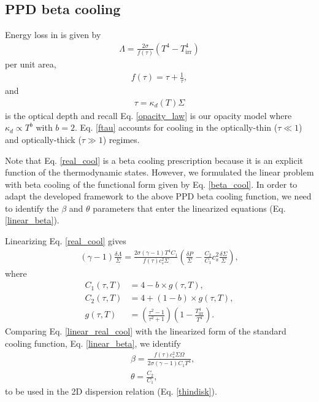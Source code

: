 \subsection{PPD beta cooling}\label{ppd_cooling}
Energy loss in  is given by 
\begin{align}\label{real_cool}
  \Lambda = \frac{2\sigma}{f(\tau)}\left(T^4 - T_\mathrm{irr}^4\right)
\end{align}
per unit area, 
\begin{align}
  f(\tau) = \tau + \frac{1}{\tau}, \label{ftau} 
\end{align}
and
\begin{align}
  \tau = \kappa_d(T)\Sigma
\end{align}
is the optical depth and recall Eq. \ref{opacity_law} 
is our opacity model where $\kappa_d\propto T^b$ with $b=2$. 
Eq. \ref{ftau} accounts for cooling in the optically-thin ($\tau\ll
1$) and optically-thick ($\tau\gg1$) regimes. 

Note that Eq. \ref{real_cool} is a beta cooling prescription because
it is an explicit function of the thermodynamic states. However, we
formulated the linear problem with beta cooling of the functional form
given by Eq. \ref{beta_cool}. In order to adapt the developed
framework to the above PPD beta cooling function, we
need to identify the $\beta$ and $\theta$ parameters that enter the 
linearized equations (Eq. \ref{linear_beta}). 
 

Linearizing Eq. \ref{real_cool} gives   
\begin{align}\label{linear_real_cool}
  (\gamma-1)\frac{\delta\Lambda}{\Sigma} = \frac{2\sigma(\gamma-1)
    T^4C_1}{f(\tau)c_{s}^2\Sigma}\left(\frac{\delta P}{\Sigma} -
  \frac{C_2}{C_1}c_{s}^2\frac{\delta\Sigma}{\Sigma}\right), 
\end{align}
where
\begin{align}
C_1(\tau, T) &= 4 - b\times g(\tau, T),\\ 
C_2(\tau, T) &= 4 + (1-b)\times g(\tau, T),\\ 
  g(\tau, T) &= \left( \frac{\tau^2-1}{\tau^2+1}\right)\left(1 -
  \frac{T_\mathrm{irr}^4}{T^4}\right). \label{g_def}
\end{align}
Comparing Eq. \ref{linear_real_cool} with the linearized form of the
standard cooling function, Eq. \ref{linear_beta}, we identify
\begin{align}
  &\beta = \frac{f(\tau)c_s^2\Sigma\Omega}{2\sigma(\gamma-1)C_1T^4},\label{real_beta}\\
  &\theta = \frac{C_2}{C_1},\label{real_theta} 
\end{align}
to be used in the 2D dispersion relation (Eq. \ref{thindisk}). 

